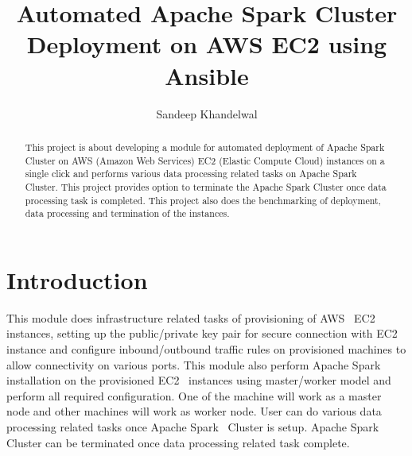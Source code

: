 
\title{Automated Apache Spark Cluster Deployment on AWS EC2 using Ansible}


\author{Sandeep Khandelwal}



\renewcommand{\shortauthors}{Sandeep}


\begin{abstract}

This project is about developing a module for automated deployment of
Apache Spark Cluster on AWS (Amazon Web Services) EC2 (Elastic Compute
Cloud) instances on a single click and performs various data
processing related tasks on Apache Spark Cluster. This project
provides option to terminate the Apache Spark Cluster once data
processing task is completed. This project also does the benchmarking
of deployment, data processing and termination of the instances.

\end{abstract}



\maketitle

\section{Introduction}

This module does infrastructure related tasks of provisioning of
AWS~\cite{hid-sp18-511-www-aws} EC2~\cite{hid-sp18-511-www-ec2}
instances, setting up the public/private key pair for secure
connection with EC2~\cite{hid-sp18-511-www-ec2} instance and configure
inbound/outbound traffic rules on provisioned machines to allow
connectivity on various ports. This module also perform Apache
Spark~\cite{hid-sp18-511-www-spark} installation on the provisioned
EC2~\cite{hid-sp18-511-www-ec2} instances using master/worker model
and perform all required configuration. One of the machine will work
as a master node and other machines will work as worker node. User can
do various data processing related tasks once Apache
Spark~\cite{hid-sp18-511-www-spark} Cluster is setup. Apache
Spark~\cite{hid-sp18-511-www-spark} Cluster can be terminated once
data processing related task complete.

